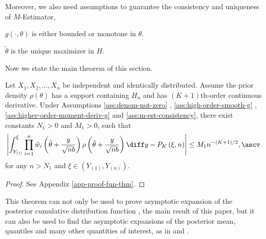 Moreover, we also need  assumptions to guarantee the consistency and uniqueness of $M$-Estimator,
\begin{assumption}
\label{ass:m-est-consistency}
$g\left(\cdot,\theta\right)$ is either bounded or monotone in $\theta$.
\end{assumption}
\begin{assumption}
\label{ass:m-est-unique}
$\tilde{\theta}$ is the unique maximizer in $H$.
\end{assumption} 
Now we state the main theorem of this section.
\begin{theorem}
\label{thm:main-thm}Let $X_{1},X_{2},\ldots,X_{n}$ be independent and identically distributed.   %
Assume the prior density $\rho\left(\theta\right)$ has a support containing
$H_n$ and has $\left(K+1\right)$th-order continuous derivative. Under Assumptions \ref{ass:denom-not-zero} , \ref{ass:high-order-smooth-g} ,\ref{ass:higher-order-moment-deriv-g} and \ref{ass:m-est-consistency},  there
exist constants $N_{1}>0$ and $M_{1}>0$, such that 
\begin{equation}
\left|\int_{Y_{\left(1\right)}}^{\xi}\prod_{i=1}^{n}\hat{w}_{i}\left(\tilde{\theta}+\frac{y}{\sqrt{n}b}\right)\rho\left(\tilde{\theta}+\frac{y}{\sqrt{n}b}\right)\diff y-P_{K}\left(\xi,n\right)\right|\le M_{1}n^{-\left(K+1\right)/2},\ascv\label{eq:fund-exp-formula}
\end{equation}
for any $n>N_{1}$ and $\xi\in\left(Y_{\left(1\right)},Y_{\left(n\right)}\right)$. \end{theorem}
\begin{proof}
See Appendix \ref{app-proof-fun-thm}.
\end{proof}
This theorem can not only be used to prove asymptotic expansion of
the posterior cumulative distribution function , the main result of this
paper, but it can also be used to find the asymptotic expansions of the
posterior mean, quantiles and many other quantities of interest, as in \cite{johnson1970asymptotic}
and \cite{vexler2014posterior} . 

